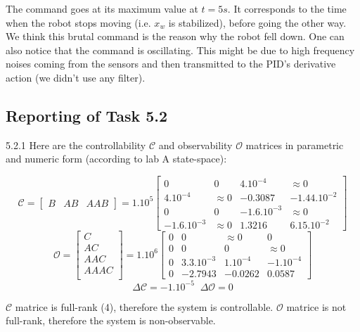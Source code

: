 \documentclass[11pt]{article}
\begin{document}
The command goes at its maximum value at $t=5 s$. It corresponds to the time when the robot stops moving (i.e. $x_w$ is stabilized), before going the other way. We think this brutal command is the reason why the robot fell down.
One can also notice that the command is oscillating. This might be due to high frequency noises coming from the sensors and then transmitted to the PID's derivative action (we didn't use any filter).

\subsection*{Reporting of Task 5.2}

5.2.1 Here are the controllability $\mathcal{C}$ and observability $\mathcal{O}$ matrices in parametric and numeric form (according to lab A state-space):

\begin{equation*}
\mathcal{C}=
	\begin{bmatrix}
	B & AB & AAB
	\end{bmatrix}
	=1.10^5
	\begin{bmatrix}
	0 & 0 & 4.10^{-4} & \approx0 \\
	4.10^{-4} & \approx0 & -0.3087 & -1.44.10^{-2} \\
	0 & 0 & -1.6.10^{-3} & \approx0 \\
	-1.6.10^{-3} & \approx0 & 1.3216 & 6.15.10^{-2}
	\end{bmatrix}
\end{equation*}
\begin{equation*}
\mathcal{O}=
	\begin{bmatrix}
	C \\
	AC \\
	AAC \\
	AAAC \\
	\end{bmatrix}
	=1.10^6
	\begin{bmatrix}
	0 & 0 & \approx0 & 0 \\
	0 & 0 & 0 & \approx0 \\
	0 & 3.3.10^{-3} & 1.10^{-4} & -1.10^{-4} \\
	0 & -2.7943 & -0.0262 & 0.0587
	\end{bmatrix}
\end{equation*}
\begin{equation*}
\Delta\mathcal{C}=-1.10^{-5} \;\; \Delta\mathcal{O}=0
\end{equation*}

$\mathcal{C}$ matrice is full-rank (4), therefore the system is controllable. 
$\mathcal{O}$ matrice is not full-rank, therefore the system is non-observable.
\end{document}
